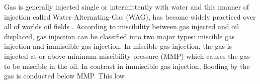 \begin{description}[style=nextline]
\item[\textbf{Gas Flooding Injection}]
Gas is generally injected single or intermittently with water and this manner of 
injection called Water-Alternating-Gas (WAG), has become widely practiced over 
all of worlds oil fields \citep{Kulkarni}. According to miscibility 
between gas injected and oil displaced, gas injection can be classified into two 
major types: miscible gas injection and immiscible gas injection.
In miscible gas injection, the gas is injected at or above minimum miscibility 
pressure (MMP) which causes the gas to be miscible in the oil.
In contrast in immiscible gas injection, flooding by the gas is conducted below MMP. This low 

\end{description}
